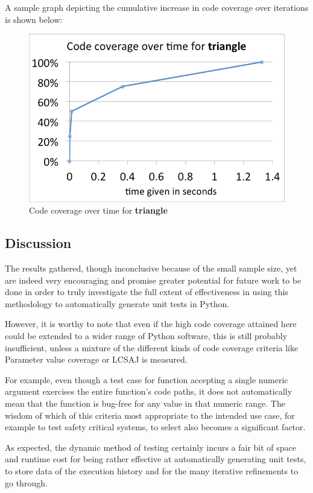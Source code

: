 \documentclass{icldt}
\numberwithin{equation}{section}       %
\begin{document}
{{A sample graph depicting the cumulative increase in code coverage over iterations is shown below:
\begin{figure}[H]
	\centering
	\includegraphics[scale=.6]{img/16b.png}
	\caption{Code coverage over time for \textbf{triangle}}
	\label{fig:cot-triangle}
\end{figure}

\subsection{Discussion}

The results gathered, though inconclusive because of the small sample size, yet are indeed very encouraging and promise greater potential for future work to be done in order to truly investigate the full extent of effectiveness in using this methodology to automatically generate unit tests in Python.

However, it is worthy to note that even if the high code coverage attained here could be extended to a wider range of Python software, this is still probably insufficient, unless a mixture of the different kinds of code coverage criteria like Parameter value coverage or LCSAJ is measured.

For example, even though a test case for function accepting a single numeric argument exercises the entire function's code paths, it does not automatically mean that the function is bug-free for any value in that numeric range. The wisdom of which of this criteria most appropriate to the intended use case, for example to test safety critical systems, to select also becomes a significant factor. 

As expected, the dynamic method of testing certainly incurs a fair bit of space and runtime cost for being rather effective at automatically generating unit tests, to store data of the execution history and for the many iterative refinements to go through.

}}
\end{document}

